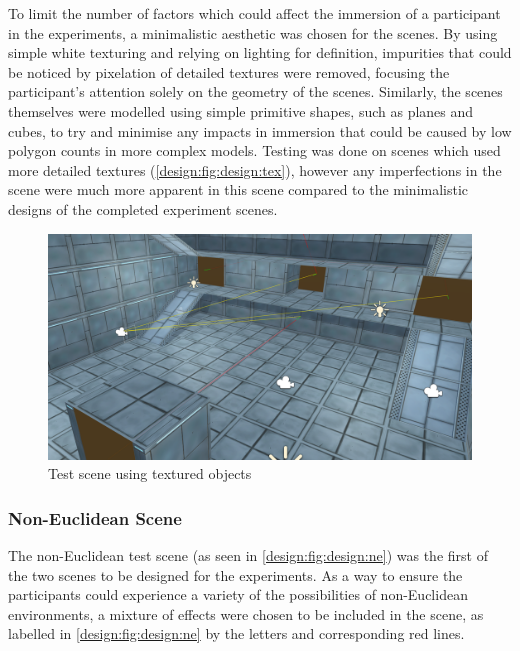 		To limit the number of factors which could affect the immersion of a participant in the experiments, a minimalistic aesthetic was chosen for the scenes.
		By using simple white texturing and relying on lighting for definition, impurities that could be noticed by pixelation of detailed textures were removed, focusing the participant's attention solely on the geometry of the scenes.
		Similarly, the scenes themselves were modelled using simple primitive shapes, such as planes and cubes, to try and minimise any impacts in immersion that could be caused by low polygon counts in more complex models.
		Testing was done on scenes which used more detailed textures (\autoref{design:fig:design:tex}), however any imperfections in the scene were much more apparent in this scene compared to the minimalistic designs of the completed experiment scenes.

		\begin{figure}[H]
			\includegraphics[width=1\textwidth]{Images/Lines_Everywhere}
			\centering
			\caption{Test scene using textured objects}
			\label{design:fig:design:tex}
		\end{figure}

		\subsubsection{Non-Euclidean Scene}

			The non-Euclidean test scene (as seen in \autoref{design:fig:design:ne}) was the first of the two scenes to be designed for the experiments.
			As a way to ensure the participants could experience a variety of the possibilities of non-Euclidean environments, a mixture of effects were chosen to be included in the scene, as labelled in \autoref{design:fig:design:ne} by the letters and corresponding red lines.

